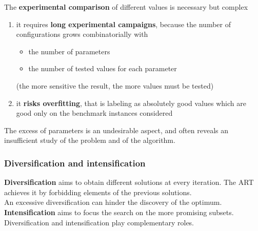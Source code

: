The \textbf{experimental comparison} of different values is necessary but complex
\begin{enumerate}
	\item it requires \textbf{long experimental campaigns}, because the number of configurations grows combinatorially with
	\begin{itemize}
		\item the number of parameters
		\item the number of tested values for each parameter
	\end{itemize}
	(the more sensitive the result, the more values must be tested)\\
	
	\item it \textbf{risks overfitting}, that is labeling as absolutely good values which are good only on the benchmark instances considered \\
\end{enumerate}

The excess of parameters is an undesirable aspect, and often reveals an insufficient study of the problem and of the algorithm.\\

\newpage

\subsubsection{Diversification and intensification}

\textbf{Diversification} aims to obtain different solutions at every iteration. The ART achieves it by forbidding elements of the previous solutions.\\
An excessive diversification can hinder the discovery of the optimum.\\

\textbf{Intensification} aims to focus the search on the more promising subsets.\\

Diversification and intensification play complementary roles.\\

